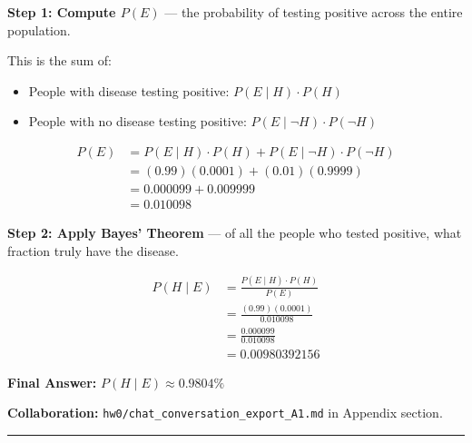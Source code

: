 \documentclass{article}
\begin{document}
\begin{aprob}
    \medskip
    \textbf{Step 1: Compute $P(E)$} --- the probability of testing positive across the entire population.

    This is the sum of:
    \begin{itemize}
        \item People with disease testing positive: $P(E \mid H) \cdot P(H)$
        \item People with no disease testing positive: $P(E \mid \neg H) \cdot P(\neg H)$
    \end{itemize}

    \begin{align*}
        P(E) &= P(E \mid H) \cdot P(H) + P(E \mid \neg H) \cdot P(\neg H) \\
              &= (0.99)(0.0001) + (0.01)(0.9999) \\
              &= 0.000099 + 0.009999 \\
              &= 0.010098
    \end{align*}

    \medskip
    \textbf{Step 2: Apply Bayes' Theorem} --- of all the people who tested positive, what fraction truly have the disease.

    \begin{align*}
        P(H \mid E) &= \frac{P(E \mid H) \cdot P(H)}{P(E)} \\[6pt]
                     &= \frac{(0.99)(0.0001)}{0.010098} \\[6pt]
                     &= \frac{0.000099}{0.010098} \\[6pt]
                     &= 0.00980392156
    \end{align*}

    \medskip
    \textbf{Final Answer:} $P(H \mid E) \approx 0.9804\%$

    \medskip
    \textbf{Collaboration:} \texttt{hw0/chat\_conversation\_export\_A1.md} in Appendix section.

\end{aprob}

\noindent\rule{\textwidth}{0.4pt}
\end{document}
